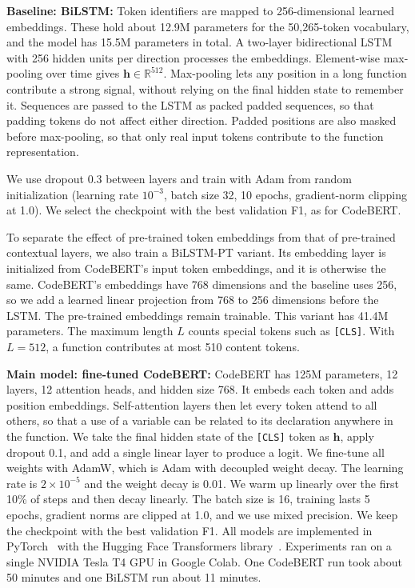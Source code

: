\documentclass{article}
\begin{document}
\textbf{Baseline: BiLSTM:}
Token identifiers are mapped to 256-dimensional learned embeddings. These hold about 12.9M parameters for the 50{,}265-token vocabulary, and the model has 15.5M parameters in total.
A two-layer bidirectional LSTM with 256 hidden units per direction processes the embeddings. Element-wise max-pooling over time gives $\mathbf{h}\in\mathbb{R}^{512}$. Max-pooling lets any position in a long function contribute a strong signal, without relying on the final hidden state to remember it.
Sequences are passed to the LSTM as packed padded sequences, so that padding tokens do not affect either direction. Padded positions are also masked before max-pooling, so that only real input tokens contribute to the function representation.

We use dropout 0.3 between layers and train with Adam from random initialization (learning rate $10^{-3}$, batch size 32, 10 epochs, gradient-norm clipping at 1.0). We select the checkpoint with the best validation F1, as for CodeBERT.

To separate the effect of pre-trained token embeddings from that of pre-trained contextual layers, we also train a BiLSTM-PT variant. Its embedding layer is initialized from CodeBERT's input token embeddings, and it is otherwise the same. CodeBERT's embeddings have 768 dimensions and the baseline uses 256, so we add a learned linear projection from 768 to 256 dimensions before the LSTM. The pre-trained embeddings remain trainable. This variant has 41.4M parameters.
The maximum length $L$ counts special tokens such as \texttt{[CLS]}. With $L = 512$, a function contributes at most 510 content tokens.

\textbf{Main model: fine-tuned CodeBERT:}
CodeBERT has 125M parameters, 12 layers, 12 attention heads, and hidden size 768. It embeds each token and adds position embeddings. Self-attention layers then let every token attend to all others, so that a use of a variable can be related to its declaration anywhere in the function.
We take the final hidden state of the \texttt{[CLS]} token as $\mathbf{h}$, apply dropout 0.1, and add a single linear layer to produce a logit.
We fine-tune all weights with AdamW, which is Adam with decoupled weight decay. The learning rate is $2\times10^{-5}$ and the weight decay is 0.01. We warm up linearly over the first 10\% of steps and then decay linearly. The batch size is 16, training lasts 5 epochs, gradient norms are clipped at 1.0, and we use mixed precision. We keep the checkpoint with the best validation F1.
All models are implemented in PyTorch~\citep{paszke2019pytorch} with the Hugging Face Transformers library~\citep{wolf2020transformers}. Experiments ran on a single NVIDIA Tesla T4 GPU in Google Colab. One CodeBERT run took about 50 minutes and one BiLSTM run about 11 minutes.
\end{document}
